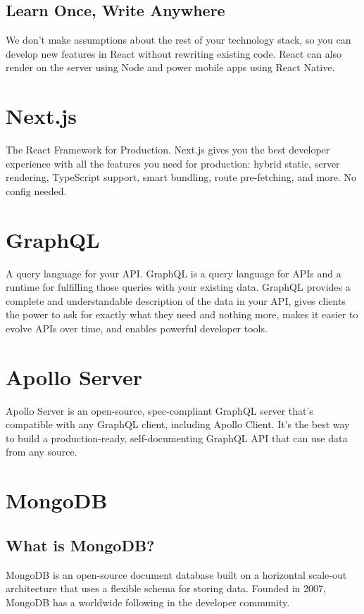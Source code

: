 \documentclass{report}
\begin{document}
\subsection{Learn Once, Write Anywhere}

We don’t make assumptions about the rest of your technology stack, so you can develop new features in React without rewriting existing code.
React can also render on the server using Node and power mobile apps using React Native.

\section{Next.js}
The React \cite{web:next:home} Framework for Production. Next.js gives you the best developer experience with all the features you need for production: hybrid static, server rendering, TypeScript support, smart bundling, route pre-fetching, and more. No config needed.

\section{GraphQL}
A query language for your API. GraphQL \cite{web:graphql:home} is a query language for APIs and a runtime for fulfilling those queries with your existing data. GraphQL provides a complete and understandable description of the data in your API, gives clients the power to ask for exactly what they need and nothing more, makes it easier to evolve APIs over time, and enables powerful developer tools.
\section{Apollo Server}
Apollo Server \cite{web:apollo:sever} is an open-source, spec-compliant GraphQL server that's compatible with any GraphQL client, including Apollo Client. It's the best way to build a production-ready, self-documenting GraphQL API that can use data from any source.

\section{MongoDB}
\subsection{What is MongoDB?}
MongoDB \cite{web:mongo:why} is an open-source document database built on a horizontal scale-out architecture that uses a flexible schema for storing data. Founded in 2007, MongoDB has a worldwide following in the developer community.
\end{document}
